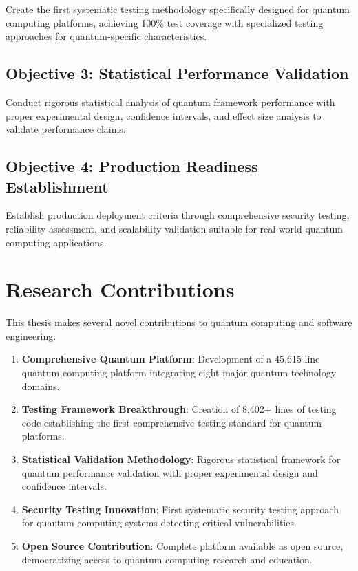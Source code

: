 \documentclass[12pt,a4paper]{report}
\begin{document}
Create the first systematic testing methodology specifically designed for quantum computing platforms, achieving 100\% test coverage with specialized testing approaches for quantum-specific characteristics.

\subsection{Objective 3: Statistical Performance Validation}

Conduct rigorous statistical analysis of quantum framework performance with proper experimental design, confidence intervals, and effect size analysis to validate performance claims.

\subsection{Objective 4: Production Readiness Establishment}

Establish production deployment criteria through comprehensive security testing, reliability assessment, and scalability validation suitable for real-world quantum computing applications.

\section{Research Contributions}

This thesis makes several novel contributions to quantum computing and software engineering:

\begin{enumerate}
\item \textbf{Comprehensive Quantum Platform}: Development of a 45,615-line quantum computing platform integrating eight major quantum technology domains.

\item \textbf{Testing Framework Breakthrough}: Creation of 8,402+ lines of testing code establishing the first comprehensive testing standard for quantum platforms.

\item \textbf{Statistical Validation Methodology}: Rigorous statistical framework for quantum performance validation with proper experimental design and confidence intervals.

\item \textbf{Security Testing Innovation}: First systematic security testing approach for quantum computing systems detecting critical vulnerabilities.

\item \textbf{Open Source Contribution}: Complete platform available as open source, democratizing access to quantum computing research and education.
\end{enumerate}
\end{document}
